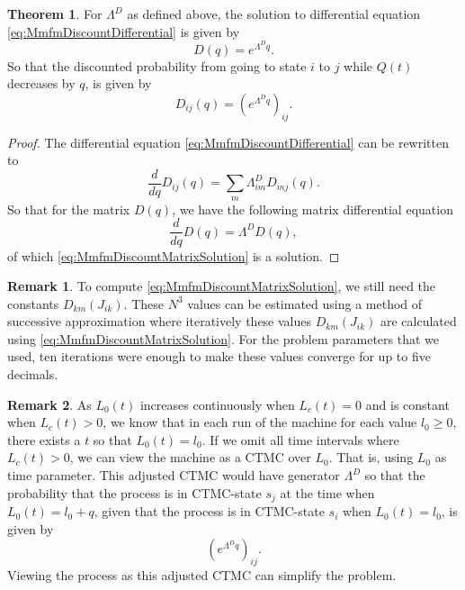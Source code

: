 \documentclass[a4paper]{thesis}
\theoremstyle{definition}
\newtheorem{remark}{Remark}[chapter]
\newtheorem{theorem}{Theorem}[section]
\begin{document}
\begin{theorem}
	For $\Lambda^D$ as defined above, the solution to differential equation \eqref{eq:MmfmDiscountDifferential} is given by
	\begin{equation}\label{eq:MmfmDiscountMatrixSolution}
	D(q)=e^{\Lambda^D q}.
	\end{equation}
	So that the discounted probability from going to state $i$ to $j$ while $Q(t)$ decreases by $q$, is given by
	\begin{equation}
	D_{ij}(q)=\left(e^{\Lambda^D q}\right)_{ij}.
	\end{equation}
	\begin{proof}
		The differential equation \eqref{eq:MmfmDiscountDifferential} can be rewritten to
		\[
			\frac{d}{dq}D_{ij}(q)=\sum\limits_m\Lambda^D_{im}D_{mj}(q).
		\]
		So that for the matrix $D(q)$, we have the following matrix differential equation
		\[
		\frac{d}{dq}D(q)=\Lambda^D D(q),
		\]
		of which \eqref{eq:MmfmDiscountMatrixSolution} is a solution.
	\end{proof}
\end{theorem}

\begin{remark}
	To compute \eqref{eq:MmfmDiscountMatrixSolution}, we still need the constants $D_{km}(J_{ik})$.
	These $N^3$ values can be estimated using a method of successive approximation where iteratively these values $D_{km}(J_{ik})$ are calculated using \eqref{eq:MmfmDiscountMatrixSolution}.
	For the problem parameters that we used, ten iterations were enough to make these values converge for up to five decimals.
\end{remark}

\begin{remark}\label{remark:MmfmStochasticShortestPath}
	As $L_0(t)$ increases continuously when $L_c(t)=0$ and is constant when $L_c(t)>0$, we know that in each run of the machine for each value $l_0\geq0$, there exists a $t$ so that $L_0(t)=l_0$.
	If we omit all time intervals where $L_c(t)>0$, we can view the machine as a CTMC over $L_0$.
	That is, using $L_0$ as time parameter.
	This adjusted CTMC would have generator $\Lambda^D$ so that the probability that the process is in CTMC-state $s_j$ at the time when $L_0(t)=l_0+q$, given that the process is in CTMC-state $s_i$ when $L_0(t)=l_0$, is given by
	\[
	\left(e^{\Lambda^Dq}\right)_{ij}.
	\]
	Viewing the process as this adjusted CTMC can simplify the problem.
\end{remark}
\end{document}
